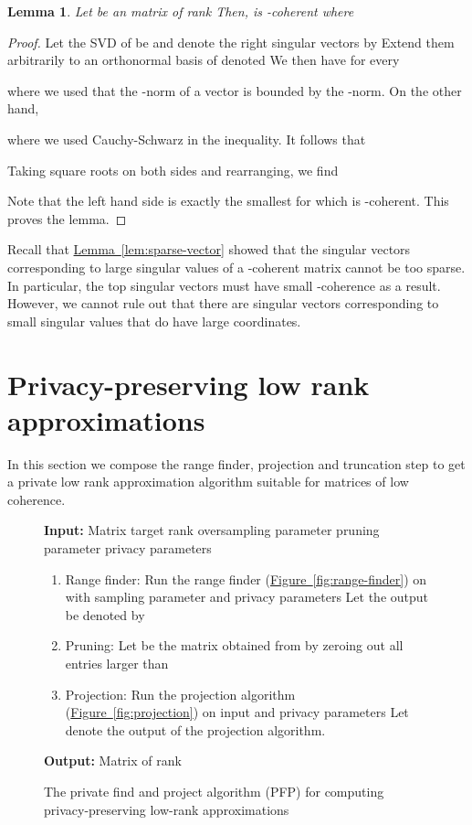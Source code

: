 \documentclass[letterpaper,11pt]{article}
\newtheorem{lemma}[theorem]{Lemma}
\theoremstyle{definition}
\newcommand{\figurelabel}[1]{\label{fig:#1}}
\newcommand{\figureref}[1]{\hyperref[fig:#1]{Figure~\ref{fig:#1}}}
\newcommand{\itemlabel}[1]{\label{item:#1}}
\newcommand{\lemmaref}[1]{\hyperref[lem:#1]{Lemma~\ref{lem:#1}}}
\newcommand{\PFP}{\textrm{\small PFP}\xspace}
\begin{document}
\begin{lemma}
Let  be an  matrix of rank  Then,  is -coherent where

\end{lemma}
\begin{proof}
Let the SVD of  be  and denote the right singular vectors by
 Extend them arbitrarily to an orthonormal basis of 
denoted  We then have for every 

where we used that the -norm of a vector is bounded by the
-norm. On the other hand,

where we used Cauchy-Schwarz in the inequality. It follows that

Taking square roots on both sides and rearranging, we find

Note that the left hand side is exactly the smallest  for which  is
-coherent. This proves the lemma.
\end{proof}

Recall that \lemmaref{sparse-vector} showed that the singular vectors
corresponding to large singular values of a -coherent matrix  cannot be
too sparse. In particular, the top singular vectors must have
small -coherence as a result. However, we cannot rule out that there
are singular vectors corresponding to small singular values that do have
large coordinates.



\section{Privacy-preserving low rank approximations}

In this section we compose the range finder, projection and truncation step to
get a private low rank approximation algorithm suitable for matrices of low
coherence.

\begin{figure}[ht]
\begin{boxedminipage}{\textwidth}
{\bf Input:} Matrix  target rank  oversampling
parameter  pruning parameter 
privacy parameters 
\begin{enumerate}
\item {\sc Range finder:}
\itemlabel{range-finder}
Run the range finder (\figureref{range-finder})
on  with sampling parameter  and privacy
parameters  Let the output be denoted by~
\item {\sc Pruning:}
\itemlabel{pruning}
Let  be the matrix obtained from  by zeroing out all entries larger
than 
\item {\sc Projection:}
\itemlabel{projection}
Run the projection algorithm (\figureref{projection}) on input  and
privacy parameters 
Let  denote the output of the projection algorithm.
\end{enumerate}
{\bf Output:} Matrix  of rank 
\end{boxedminipage}
\caption{The private find and project algorithm (\PFP) for computing
privacy-preserving low-rank approximations}
\figurelabel{find-project}
\end{figure}
\end{document}
